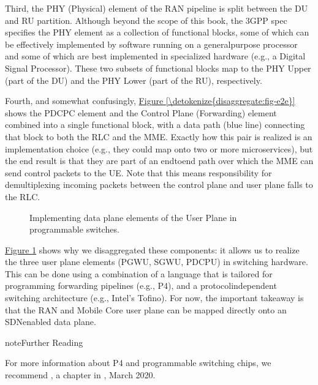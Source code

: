 \documentclass[a4paper,11pt,english]{sphinxmanual}
\let\sphinxpxdimen\pdfpxdimen\else\newdimen\sphinxpxdimen
\begin{document}
\sphinxAtStartPar
Third, the PHY (Physical) element of the RAN pipeline is split between
the DU and RU partition. Although beyond the scope of this book, the
3GPP spec specifies the PHY element as a collection of functional
blocks, some of which can be effectively implemented by software running
on a general\sphinxhyphen{}purpose processor and some of which are best implemented in
specialized hardware (e.g., a Digital Signal Processor). These two
subsets of functional blocks map to the PHY Upper (part of the DU) and
the PHY Lower (part of the RU), respectively.

\sphinxAtStartPar
Fourth, and somewhat confusingly, \hyperref[\detokenize{disaggregate:fig-e2e}]{Figure \ref{\detokenize{disaggregate:fig-e2e}}}
shows the PDCP\sphinxhyphen{}C
element and the Control Plane (Forwarding) element combined into a
single functional block, with a data path (blue line) connecting that
block to both the RLC and the MME. Exactly how this pair is realized is
an implementation choice (e.g., they could map onto two or more
microservices), but the end result is that they are part of an
end\sphinxhyphen{}to\sphinxhyphen{}end path over which the MME can send control packets to the UE.
Note that this means responsibility for demultiplexing incoming packets
between the control plane and user plane falls to the RLC.

\begin{figure}[ht]
\centering
\capstart

\noindent\sphinxincludegraphics[width=600\sphinxpxdimen]{{Slide22}.png}
\caption{Implementing data plane elements of the User Plane in
programmable switches.}\label{\detokenize{disaggregate:id2}}\label{\detokenize{disaggregate:fig-e2e-p4}}\end{figure}

\sphinxAtStartPar
\hyperref[\detokenize{disaggregate:fig-e2e-p4}]{Figure \ref{\detokenize{disaggregate:fig-e2e-p4}}} shows why we disaggregated these
components: it allows us to realize the three user plane elements
(PGW\sphinxhyphen{}U, SGW\sphinxhyphen{}U, PDCP\sphinxhyphen{}U) in switching hardware. This can be done using a
combination of a language that is tailored for programming forwarding
pipelines (e.g., P4), and a protocol\sphinxhyphen{}independent switching
architecture (e.g., Intel’s Tofino). For now, the important takeaway is that
the RAN and Mobile Core user plane can be mapped directly onto an
SDN\sphinxhyphen{}enabled data plane.

\label{\detokenize{disaggregate:reading-p4}}
\begin{sphinxadmonition}{note}{Further Reading}

\sphinxAtStartPar
For more information about P4 and programmable switching chips, we
recommend , a chapter in
, March 2020.
\end{sphinxadmonition}
\end{document}
